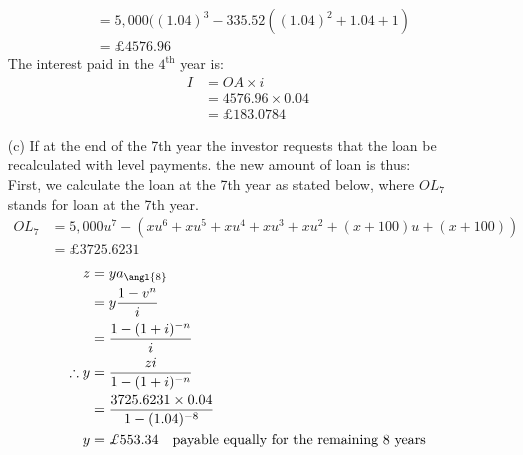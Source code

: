 \documentclass[12pt,a4paper]{article}
\begin{document}
\begin{enumerate}
\begin{align*}
	&=  5,000((1.04)^3  -  335.52((1.04)^2  +  1.04 +1)\\
	&=  \pounds 4576.96
\end{align*}
The interest paid in the $4^{\text{th}}$ year is:
\begin{align*}
	I &=  OA \times i\\
	                   &= 4576.96 \times 0.04\\
	                   &= \pounds 183.0784
\end{align*}
\item[(c)] If at the end of the 7th year the investor requests that the loan be recalculated with level payments. the new amount of loan is thus:\\
First, we calculate the loan at the 7th year as stated below, where $OL_7$ stands for loan at the 7th year.
\begin{align*}
  OL_7  &= 5,000u^7  - (xu^6 + xu^5 + xu^4 + xu^3 + xu^2 + (x +100)u + (x+100))\\
             &= \pounds  3725.6231
\end{align*}
\begin{align*}
   z  &=  y a_{\angl{8}}\\
       &= y \frac{1-v^n}{ i} \\
       &=  \frac{1 - (1+i )^{-n}}{i}\\
  \therefore y  &= \frac{zi}{ 1 - (1 +i)^{-n}  }\\
  					&= \frac{3725.6231 \times 0.04   }{  1 - (1.04)^{-8}  }\\
  				y 	& =  \pounds 553.34 \quad \text{payable equally for the remaining 8 years}
\end{align*}
\end{enumerate}
\end{document}
